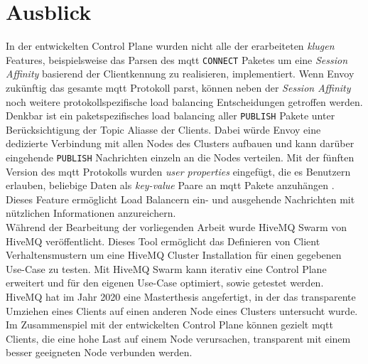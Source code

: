 \section{Ausblick}
In der entwickelten Control Plane wurden nicht alle der erarbeiteten \textit{klugen} Features, beispielsweise das Parsen des \ac{mqtt} \verb|CONNECT| Paketes um eine \textit{Session Affinity} basierend der Clientkennung zu realisieren, implementiert.
Wenn Envoy zukünftig das gesamte \ac{mqtt} Protokoll parst, können neben der \textit{Session Affinity} noch weitere protokollspezifische load balancing Entscheidungen getroffen werden.
Denkbar ist ein paketspezifisches load balancing aller \verb|PUBLISH| Pakete unter Berücksichtigung der Topic Aliasse der Clients. Dabei würde Envoy eine dedizierte Verbindung mit allen Nodes des Clusters aufbauen und kann darüber eingehende \verb|PUBLISH| Nachrichten einzeln an die Nodes verteilen.
Mit der fünften Version des \ac{mqtt} Protokolls wurden \textit{user properties} eingefügt, die es Benutzern erlauben, beliebige Daten als \textit{key-value} Paare an \ac{mqtt} Pakete anzuhängen \cite{raschbichlerMQTTHowNewa}.
Dieses Feature ermöglicht Load Balancern ein- und ausgehende Nachrichten mit nützlichen Informationen anzureichern.
\\
Während der Bearbeitung der vorliegenden Arbeit wurde HiveMQ Swarm \cite{teamHiveMQSwarmFind} von HiveMQ veröffentlicht. Dieses Tool ermöglicht das Definieren von Client Verhaltensmustern um eine HiveMQ Cluster Installation für einen gegebenen Use-Case zu testen.
Mit HiveMQ Swarm kann iterativ eine Control Plane erweitert und für den eigenen Use-Case optimiert, sowie getestet werden.
\\
HiveMQ hat im Jahr 2020 eine Masterthesis angefertigt, in der das transparente Umziehen eines Clients auf einen anderen Node eines Clusters untersucht wurde. Im Zusammenspiel mit der entwickelten Control Plane können gezielt \ac{mqtt} Clients, die eine hohe Last auf einem Node verursachen, transparent mit einem besser geeigneten Node verbunden werden.

